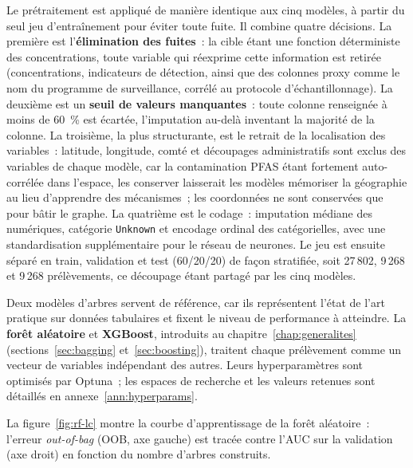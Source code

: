 \label{sec:contrib-pretraitement}

Le pr\'etraitement est appliqu\'e de mani\`ere identique aux cinq mod\`eles, \`a partir du seul jeu d'entra\^inement pour \'eviter toute fuite. Il combine quatre d\'ecisions. La premi\`ere est l'\textbf{\'elimination des fuites}~: la cible \'etant une fonction d\'eterministe des concentrations, toute variable qui r\'eexprime cette information est retir\'ee (concentrations, indicateurs de d\'etection, ainsi que des colonnes proxy comme le nom du programme de surveillance, corr\'el\'e au protocole d'\'echantillonnage). La deuxi\`eme est un \textbf{seuil de valeurs manquantes}~: toute colonne renseign\'ee \`a moins de 60~\% est \'ecart\'ee, l'imputation au-del\`a inventant la majorit\'e de la colonne. La troisi\`eme, la plus structurante, est le retrait de la localisation des variables~: latitude, longitude, comt\'e et d\'ecoupages administratifs sont exclus des variables de chaque mod\`ele, car la contamination PFAS \'etant fortement auto-corr\'el\'ee dans l'espace, les conserver laisserait les mod\`eles m\'emoriser la g\'eographie au lieu d'apprendre des m\'ecanismes~; les coordonn\'ees ne sont conserv\'ees que pour b\^atir le graphe. La quatri\`eme est le codage~: imputation m\'ediane des num\'eriques, cat\'egorie \texttt{Unknown} et encodage ordinal des cat\'egorielles, avec une standardisation suppl\'ementaire pour le r\'eseau de neurones. Le jeu est ensuite s\'epar\'e en train, validation et test (60/20/20) de fa\c{c}on stratifi\'ee, soit 27\,802, 9\,268 et 9\,268 pr\'el\`evements, ce d\'ecoupage \'etant partag\'e par les cinq mod\`eles.

\label{sec:contrib-tabulaires}

Deux mod\`eles d'arbres servent de r\'ef\'erence, car ils repr\'esentent l'\'etat de l'art pratique sur donn\'ees tabulaires et fixent le niveau de performance \`a atteindre. La \textbf{for\^et al\'eatoire} et \textbf{XGBoost}, introduits au chapitre~\ref{chap:generalites} (sections~\ref{sec:bagging} et~\ref{sec:boosting}), traitent chaque pr\'el\`evement comme un vecteur de variables ind\'ependant des autres. Leurs hyperparam\`etres sont optimis\'es par Optuna~; les espaces de recherche et les valeurs retenues sont d\'etaill\'es en annexe~\ref{ann:hyperparams}.

La figure~\ref{fig:rf-lc} montre la courbe d'apprentissage de la for\^et al\'eatoire~: l'erreur \emph{out-of-bag} (OOB, axe gauche) est trac\'ee contre l'AUC sur la validation (axe droit) en fonction du nombre d'arbres construits.

